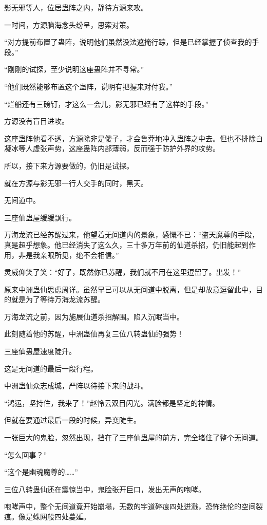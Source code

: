 \begin{this_body}
影无邪等人，位居蛊阵之内，静待方源来攻。

一时间，方源脑海念头纷呈，思索对策。

“对方提前布置了蛊阵，说明他们虽然没法遮掩行踪，但是已经掌握了侦查我的手段。”

“刚刚的试探，至少说明这座蛊阵并不寻常。”

“他们既然能够布置这个蛊阵，说明有把握来对付我。”

“烂船还有三磅钉，才这么一会儿，影无邪已经有了这样的手段。”

方源没有盲目进攻。

这座蛊阵他看不透，方源除非是傻子，才会鲁莽地冲入蛊阵之中去。但也不排除白凝冰等人虚张声势，这座蛊阵内部薄弱，反而强于防护外界的攻势。

所以，接下来方源要做的，仍旧是试探。

就在方源与影无邪一行人交手的同时，黑天。

无间道中。

三座仙蛊屋缓缓飘行。

万海龙流已经苏醒过来，他望着无间道内的景象，感慨不已：“盗天魔尊的手段，真是超乎想象。他已经消失了这么久，三十多万年前的仙道杀招，仍旧能起到作用，非是我亲眼所见，绝不会相信。”

灵威仰笑了笑：“好了，既然你已苏醒，我们就不用在这里逗留了。出发！”

原来中洲蛊仙思虑周详。虽然早已可以从无间道中脱离，但是却故意逗留此中，目的就是为了等待万海龙流苏醒。

万海龙流之前，因为施展仙道杀招解围。陷入沉眠当中。

此刻随着他的苏醒，中洲蛊仙再复三位八转蛊仙的强势！

三座仙蛊屋速度陡升。

这是无间道的最后一段行程。

中洲蛊仙众志成城，严阵以待接下来的战斗。

“鸿运，坚持住，我来了！”赵怜云双目闪光。满脸都是坚定的神情。

但就在要通过最后一段的时候，异变陡生。

一张巨大的鬼脸，忽然出现，挡在了三座仙蛊屋的前方，完全堵住了整个无间道。

“怎么回事？”

“这个是幽魂魔尊的……”

三位八转蛊仙还在震惊当中，鬼脸张开巨口，发出无声的咆哮。

咆哮声中，整个无间道竟开始崩塌，无数的宇道碎痕四处迸溅，恐怖绝伦的空间裂痕。像是蛛网般四处蔓延。


\end{this_body}
